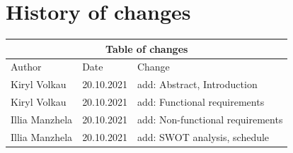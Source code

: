 \documentclass[a4paper,11pt,twoside]{report}
\theoremstyle{definition}
\begin{document}
\null\thispagestyle{empty}\newpage








%
%
%
%
%
\chapter*{History of changes}
\begin{tabular}{ |p{3cm}|p{3cm}|p{7cm}|  }
 	\hline
 	\multicolumn{3}{|c|}{Table of changes} \\
 	\hline
 	Author & Date & Change\\
 	\hline
 	Kiryl Volkau   & 20.10.2021    & add: Abstract, Introduction \\
	Kiryl Volkau   & 20.10.2021    & add: Functional requirements \\
 	Illia Manzhela &  20.10.2021  & add: Non-functional requirements \\
 	Illia Manzhela &  20.10.2021  & add: SWOT analysis, schedule \\
 	\hline
\end{tabular}
\tableofcontents
\thispagestyle{empty}
\newpage %
\end{document}
